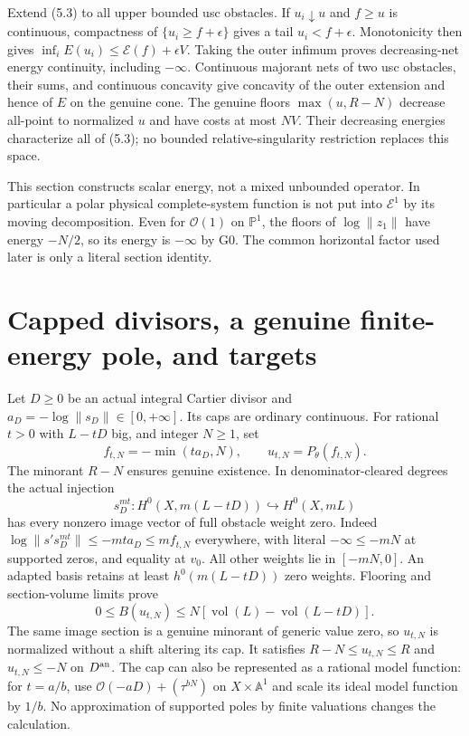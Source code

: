 \documentclass[10pt]{article}
\newcommand{\vol}{\operatorname{vol}}
\newcommand{\E}{\mathcal E}
\newcommand{\OO}{\mathcal O}
\begin{document}
Extend (5.3) to all upper bounded usc obstacles. If $u_i\downarrow u$
and $f\geq u$ is continuous, compactness of
$\{u_i\geq f+\epsilon\}$ gives a tail $u_i<f+\epsilon$. Monotonicity
then gives $\inf_i E(u_i)\leq\mathscr E(f)+\epsilon V$.
Taking the outer infimum proves decreasing-net energy continuity,
including $-\infty$. Continuous majorant nets of two usc obstacles,
their sums, and continuous concavity give concavity of the outer extension
and hence of $E$ on the genuine cone. The genuine floors
$\max(u,R-N)$ decrease all-point to normalized $u$ and have costs at
most $NV$. Their decreasing energies characterize all of (5.3); no bounded
relative-singularity restriction replaces this space.

This section constructs scalar energy, not a mixed unbounded operator.
In particular a polar physical complete-system function is not put into
$\E^1$ by its moving decomposition. Even for $\OO(1)$ on $\mathbb P^1$,
the floors of $\log\|z_1\|$ have energy $-N/2$, so its energy is
$-\infty$ by G0. The common horizontal factor used later is only a
literal section identity.

\section{Capped divisors, a genuine finite-energy pole, and targets}
Let $D\geq0$ be an actual integral Cartier divisor and
$a_D=-\log\|s_D\|\in[0,+\infty]$. Its caps are ordinary continuous.
For rational $t>0$ with $L-tD$ big, and integer $N\geq1$, set
\[
 f_{t,N}=-\min(t a_D,N),\qquad u_{t,N}=P_\theta(f_{t,N}).
\]
The minorant $R-N$ ensures genuine existence. In denominator-cleared
degrees the actual injection
\[
 s_D^{mt}:H^0(X,m(L-tD))\hookrightarrow H^0(X,mL)
\]
has every nonzero image vector of full obstacle weight zero. Indeed
$\log\|s' s_D^{mt}\|\leq-mt a_D\leq m f_{t,N}$ everywhere, with literal
$-\infty\leq-mN$ at supported zeros, and equality at $v_0$. All other
weights lie in $[-mN,0]$. An adapted basis retains at least
$h^0(m(L-tD))$ zero weights. Flooring and section-volume limits prove
\[
 0\leq B(u_{t,N})\leq N[\vol(L)-\vol(L-tD)].
\tag{6.1}
\]
The same image section is a genuine minorant of generic value zero, so
$u_{t,N}$ is normalized without a shift altering its cap. It satisfies
$R-N\leq u_{t,N}\leq R$ and $u_{t,N}\leq-N$ on $D^{\rm an}$.
The cap can also be represented as a rational model function: for
$t=a/b$, use $\OO(-aD)+(\tau^{bN})$ on $X\times\mathbb A^1$ and scale
its ideal model function by $1/b$. No approximation of supported poles
by finite valuations changes the calculation.
\end{document}

